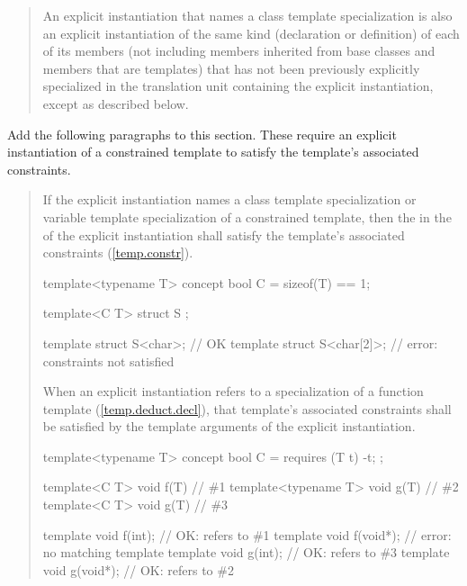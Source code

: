 \begin{quote}
\setcounter{Paras}{7}
\pnum
An explicit instantiation that names a class template specialization is 
also an explicit instantiation of the same kind (declaration or 
definition) of each of its members (not including members inherited from 
base classes and members that are templates) that has not been previously 
explicitly specialized in the translation unit containing the explicit 
instantiation,  except as described below.
\end{quote}

Add the following paragraphs to this section. These require an explicit
instantiation of a constrained template to satisfy the template's
associated constraints.

\begin{quote}
\begin{addedblock}
\setcounter{Paras}{13}
\pnum
If the explicit instantiation names a class template specialization
or variable template specialization of a constrained template, then
the  in the
 of the explicit
instantiation shall satisfy the template's associated constraints
(\ref{temp.constr}).
\enterexample
\begin{codeblock}
template<typename T> concept bool C = sizeof(T) == 1;

template<C T> struct S { };

template struct S<char>;    // OK
template struct S<char[2]>; // error: constraints not satisfied
\end{codeblock}
\exitexample

\pnum
When an explicit instantiation refers to a specialization of a
function template (\ref{temp.deduct.decl}), that 
template's associated constraints shall be satisfied by the template 
arguments of the explicit instantiation.

\enterexample
\begin{codeblock}
template<typename T> concept bool C = requires (T t) { -t; };

template<C T>        void f(T) { } // \#1
template<typename T> void g(T) { } // \#2
template<C T>        void g(T) { } // \#3

template void f(int);   // OK: refers to \#1
template void f(void*); // error: no matching template
template void g(int);   // OK: refers to \#3
template void g(void*); // OK: refers to \#2
\end{codeblock}
\exitexample
\end{addedblock}
\end{quote}


